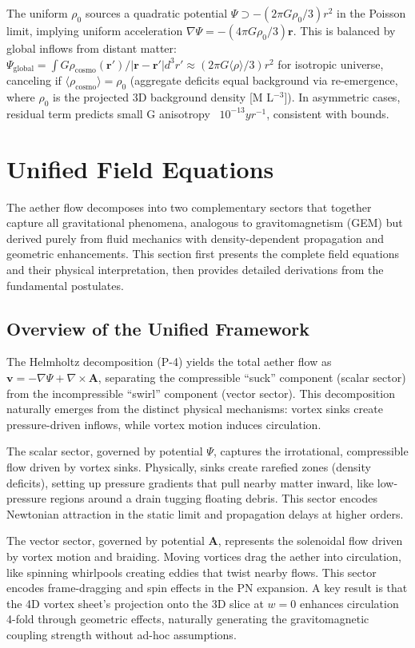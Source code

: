 \documentclass{article}
\begin{document}
The uniform $\rho_0$ sources a quadratic potential $\Psi \supset - (2\pi G \rho_0 / 3) r^2$ in the Poisson limit, implying uniform acceleration $\nabla \Psi = - (4\pi G \rho_0 / 3) \mathbf{r}$. This is balanced by global inflows from distant matter: $\Psi_{\text{global}} = \int G \rho_{\text{cosmo}}(\mathbf{r}') / |\mathbf{r} - \mathbf{r}'| d^3 r' \approx (2\pi G \langle \rho \rangle / 3) r^2$ for isotropic universe, canceling if $\langle \rho_{\text{cosmo}} \rangle = \rho_0$ (aggregate deficits equal background via re-emergence, where $\rho_0$ is the projected 3D background density [M L$^{-3}$]). In asymmetric cases, residual term predicts small G anisotropy ~$10^{-13} yr^{-1}$, consistent with bounds.

\section{Unified Field Equations}

The aether flow decomposes into two complementary sectors that together capture all gravitational phenomena, analogous to gravitomagnetism (GEM) but derived purely from fluid mechanics with density-dependent propagation and geometric enhancements. This section first presents the complete field equations and their physical interpretation, then provides detailed derivations from the fundamental postulates.

\subsection{Overview of the Unified Framework}

The Helmholtz decomposition (P-4) yields the total aether flow as $\mathbf{v} = -\nabla \Psi + \nabla \times \mathbf{A}$, separating the compressible ``suck'' component (scalar sector) from the incompressible ``swirl'' component (vector sector). This decomposition naturally emerges from the distinct physical mechanisms: vortex sinks create pressure-driven inflows, while vortex motion induces circulation.

The scalar sector, governed by potential $\Psi$, captures the irrotational, compressible flow driven by vortex sinks. Physically, sinks create rarefied zones (density deficits), setting up pressure gradients that pull nearby matter inward, like low-pressure regions around a drain tugging floating debris. This sector encodes Newtonian attraction in the static limit and propagation delays at higher orders.

The vector sector, governed by potential $\mathbf{A}$, represents the solenoidal flow driven by vortex motion and braiding. Moving vortices drag the aether into circulation, like spinning whirlpools creating eddies that twist nearby flows. This sector encodes frame-dragging and spin effects in the PN expansion. A key result is that the 4D vortex sheet's projection onto the 3D slice at $w=0$ enhances circulation 4-fold through geometric effects, naturally generating the gravitomagnetic coupling strength without ad-hoc assumptions.
\end{document}
